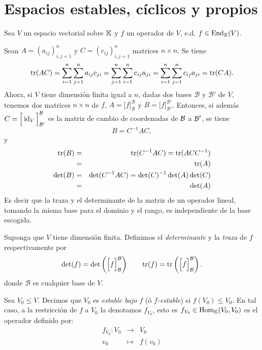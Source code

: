 \section{Espacios estables, cíclicos y propios}

Sea $V$ un espacio vectorial sobre $\mathbb{K}$ y $f$ un operador de $V$, e.d. $f\in\operatorname{End}_{\mathbb{K}}(V)$.

\begin{obs}
Sean $A=(a_{ij})_{i,j=1}^n$ y $C=(c_{ij})_{i,j=1}^n$ matrices $n\times n$. Se tiene
\[
  \operatorname{tr}(AC)=\sum_{i=1}^n\sum_{j=1}^na_{ij}c_{ji}=\sum_{j=1}^n\sum_{i=1}^nc_{ij}a_{ji}=\sum_{i=1}^n\sum_{j=1}^nc_{ij}a_{ji}=\operatorname{tr}(CA).
\]
Ahora, si $V$ tiene dimensi\'on finita igual a $n$, dadas dos bases $\mathcal{B}$ y $\mathcal{B}'$ de $V$, tenemos dos matrices $n\times n$ de $f$, $A=\Big[f\Big]^{\mathcal{B}}_{\mathcal{B}}$ y $B=\Big[f\Big]^{\mathcal{B}'}_{\mathcal{B}'}$. Entonces, si adem\'as $C=\Big[\operatorname{id}_V\Big]_{\mathcal{B}'}^{\mathcal{B}}$ es la matriz de cambio de coordenadas de $\mathcal{B}$ a $\mathcal{B}'$, se tiene
\[
  B=C^{-1}AC,
\]
y
\begin{eqnarray*}
  \operatorname{tr}(B) & = &\operatorname{tr}(C^{-1}AC)=\operatorname{tr}(ACC^{-1})\\
           & = &\operatorname{tr}(A)\\
  \det(B) & = & \det(C^{-1}AC)=\det(C)^{-1}\det(A)\det(C)\\
             & = &\det(A)
\end{eqnarray*}
Es decir que la traza y el determinante de la matriz de un operador lineal, tomando la misma base para el dominio y el rango, es independiente de la base escogida.
\end{obs}

\begin{defn}
Suponga que $V$ tiene dimensi\'on finita. Definimos el \emph{determinante} y la \emph{traza} de $f$ respectivamente por
\[
\det(f)=\det\left(\Big[f\Big]^{\mathcal{B}}_{\mathcal{B}}\right)\qquad \operatorname{tr}(f)=\operatorname{tr}\left(\Big[f\Big]^{\mathcal{B}}_{\mathcal{B}}\right).
\]
donde $\mathcal{B}$ es cualquier base de $V$.
\end{defn}

\begin{defn}
Sea $V_0\le V$. Decimos que $V_0$ es \emph{estable bajo $f$} (ó \emph{$f$-estable}) si $f(V_0)\le V_0$. En tal caso, a la restricci\'on de $f$ a $V_0$ la denotamos $f_{V_0}$, esto es $f_{V_0}\in\operatorname{Hom}_{\mathbb{K}}(V_0,V_0)$ es el operador definido por:
\begin{eqnarray*}
f_{V_0}: V_0 & \longrightarrow & V_0\\
 v_0 & \longmapsto & f(v_0)
\end{eqnarray*}
\end{defn}

